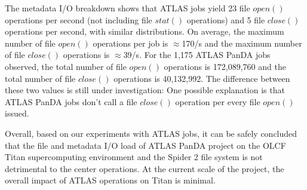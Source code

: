 The metadata I/O breakdown shows that ATLAS jobs yield 23 file $open()$
operations per second (not including file $stat()$ operations) and 5 file $close()$ operations per second, with similar distributions.
On average, the maximum number of file $open()$ operations per job is
$\approx$170/s and the maximum number of file $close()$ operations is
$\approx$39/s.
For the 1,175 ATLAS PanDA jobs observed, the total number of file $open()$
operations is 172,089,760 and the total number of file $close()$ operations is
40,132,992. The difference between these two values is still under
investigation: One possible explanation is that ATLAS PanDA jobs don't call a
file $close()$ operation per every file $open()$ issued.

Overall, based on our experiments with ATLAS jobs, it can be safely concluded
that the file and metadata I/O load of ATLAS PanDA project on the OLCF Titan
supercomputing environment and the Spider 2 file system is not detrimental to
the center operations. At the current scale of the project, the overall impact
of ATLAS operations on Titan is minimal.
